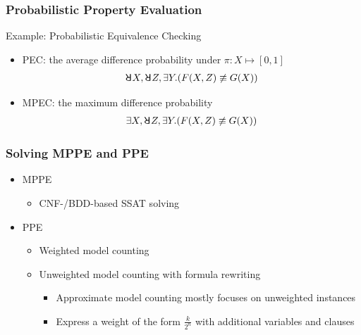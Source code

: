 \begin{frame}
  \frametitle{Probabilistic Property Evaluation}
  \begin{block}{Example: Probabilistic Equivalence Checking}
    \begin{figure}
      \centering
      
    \end{figure}
    \begin{itemize}
      \item PEC: the average difference probability under $\pi:X\mapsto[0,1]$
            \abovedisplayskip=0pt
            \belowdisplayskip=0pt
            \begin{align*}
              \random{} X,\random{} Z,\exists Y.(F(X,Z) \not\equiv G(X))
            \end{align*}
            \abovedisplayskip=0pt
            \belowdisplayskip=0pt
      \item MPEC: the maximum difference probability
            \begin{align*}
              \exists X,\random{} Z,\exists Y.(F(X,Z) \not\equiv G(X))
            \end{align*}
    \end{itemize}
  \end{block}
\end{frame}

\begin{frame}
  \frametitle{Solving MPPE and PPE}
  \begin{itemize}
    \item MPPE
          \begin{itemize}
            \item CNF-/BDD-based SSAT solving
          \end{itemize}
          \pause
    \item PPE
          \begin{itemize}
            \item Weighted model counting
            \item Unweighted model counting with formula rewriting
                  \begin{itemize}
                    \item Approximate model counting mostly focuses on unweighted instances
                    \item Express a weight of the form $\frac{k}{2^n}$ with additional variables and clauses
                  \end{itemize}
          \end{itemize}
  \end{itemize}
\end{frame}

